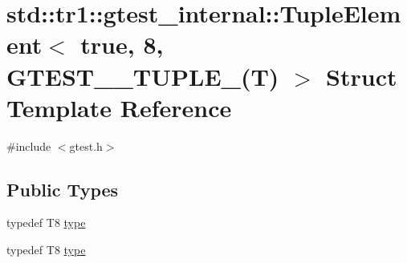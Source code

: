 \hypertarget{structstd_1_1tr1_1_1gtest__internal_1_1_tuple_element_3_01true_00_018_00_01_g_t_e_s_t__10___t_u_p_l_e___07_t_08_01_4}{\section{std\-:\-:tr1\-:\-:gtest\-\_\-internal\-:\-:Tuple\-Element$<$ true, 8, G\-T\-E\-S\-T\-\_\-\_\-\-T\-U\-P\-L\-E\-\_\-(T) $>$ Struct Template Reference}
\label{structstd_1_1tr1_1_1gtest__internal_1_1_tuple_element_3_01true_00_018_00_01_g_t_e_s_t__10___t_u_p_l_e___07_t_08_01_4}
}


{\ttfamily \#include $<$gtest.\-h$>$}

\subsection*{Public Types}
\begin{DoxyCompactItemize}
\item 
typedef T8 \hyperlink{structstd_1_1tr1_1_1gtest__internal_1_1_tuple_element_3_01true_00_018_00_01_g_t_e_s_t__10___t_u_p_l_e___07_t_08_01_4_a7b4d456a790291b651b4179650754587}{type}
\item 
typedef T8 \hyperlink{structstd_1_1tr1_1_1gtest__internal_1_1_tuple_element_3_01true_00_018_00_01_g_t_e_s_t__10___t_u_p_l_e___07_t_08_01_4_a7b4d456a790291b651b4179650754587}{type}
\end{DoxyCompactItemize}


